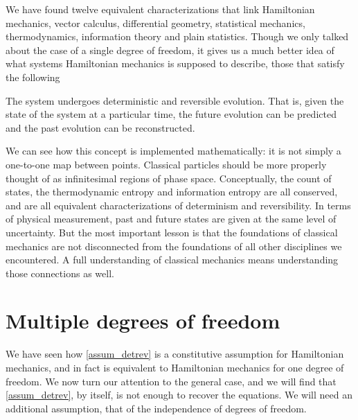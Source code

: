 We have found twelve equivalent characterizations that link Hamiltonian mechanics, vector calculus, differential geometry, statistical mechanics, thermodynamics, information theory and plain statistics. Though we only talked about the case of a single degree of freedom, it gives us a much better idea of what systems Hamiltonian mechanics is supposed to describe, those that satisfy the following
\renewcommand{\theassump}{DR}
\begin{assump}\label{assum_detrev}
	The system undergoes deterministic and reversible evolution. That is, given the state of the system at a particular time, the future evolution can be predicted and the past evolution can be reconstructed.
\end{assump}
\renewcommand{\theassump}{\Roman{assump}}
We can see how this concept is implemented mathematically: it is not simply a one-to-one map between points. Classical particles should be more properly thought of as infinitesimal regions of phase space. Conceptually, the count of states, the thermodynamic entropy and information entropy are all conserved, and are all equivalent characterizations of determinism and reversibility. In terms of physical measurement, past and future states are given at the same level of uncertainty. But the most important lesson is that the foundations of classical mechanics are not disconnected from the foundations of all other disciplines we encountered. A full understanding of classical mechanics means understanding those connections as well.

\section{Multiple degrees of freedom}

We have seen how \ref{assum_detrev} is a constitutive assumption for Hamiltonian mechanics, and in fact is equivalent to Hamiltonian mechanics for one degree of freedom. We now turn our attention to the general case, and we will find that \ref{assum_detrev}, by itself, is not enough to recover the equations. We will need an additional assumption, that of the independence of degrees of freedom.

